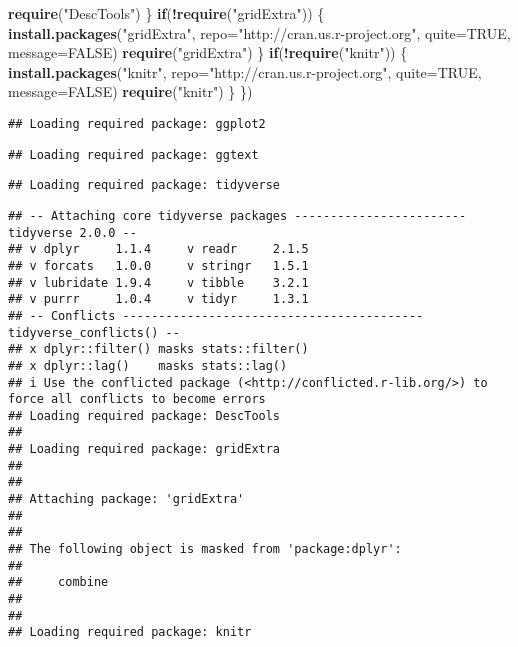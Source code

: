 \documentclass[
]{article}
\newenvironment{Shaded}{\begin{snugshade}}{\end{snugshade}}
\newcommand{\AttributeTok}[1]{\textcolor[rgb]{0.13,0.29,0.53}{#1}}
\newcommand{\ConstantTok}[1]{\textcolor[rgb]{0.56,0.35,0.01}{#1}}
\newcommand{\ControlFlowTok}[1]{\textcolor[rgb]{0.13,0.29,0.53}{\textbf{#1}}}
\newcommand{\FunctionTok}[1]{\textcolor[rgb]{0.13,0.29,0.53}{\textbf{#1}}}
\newcommand{\NormalTok}[1]{#1}
\newcommand{\SpecialCharTok}[1]{\textcolor[rgb]{0.81,0.36,0.00}{\textbf{#1}}}
\newcommand{\StringTok}[1]{\textcolor[rgb]{0.31,0.60,0.02}{#1}}
\begin{document}
\begin{Shaded}
\begin{Highlighting}[]
 \FunctionTok{require}\NormalTok{(}\StringTok{"DescTools"}\NormalTok{)}
\NormalTok{ \}}
 \ControlFlowTok{if}\NormalTok{(}\SpecialCharTok{!}\FunctionTok{require}\NormalTok{(}\StringTok{"gridExtra"}\NormalTok{)) \{}
 \FunctionTok{install.packages}\NormalTok{(}\StringTok{"gridExtra"}\NormalTok{, }\AttributeTok{repo=}\StringTok{"http://cran.us.r{-}project.org"}\NormalTok{, }\AttributeTok{quite=}\ConstantTok{TRUE}\NormalTok{, }\AttributeTok{message=}\ConstantTok{FALSE}\NormalTok{)}
 \FunctionTok{require}\NormalTok{(}\StringTok{"gridExtra"}\NormalTok{)}
\NormalTok{ \}}
 \ControlFlowTok{if}\NormalTok{(}\SpecialCharTok{!}\FunctionTok{require}\NormalTok{(}\StringTok{"knitr"}\NormalTok{)) \{}
 \FunctionTok{install.packages}\NormalTok{(}\StringTok{"knitr"}\NormalTok{, }\AttributeTok{repo=}\StringTok{"http://cran.us.r{-}project.org"}\NormalTok{, }\AttributeTok{quite=}\ConstantTok{TRUE}\NormalTok{, }\AttributeTok{message=}\ConstantTok{FALSE}\NormalTok{)}
 \FunctionTok{require}\NormalTok{(}\StringTok{"knitr"}\NormalTok{)}
\NormalTok{ \}}
\NormalTok{\})}
\end{Highlighting}
\end{Shaded}

\begin{verbatim}
## Loading required package: ggplot2
\end{verbatim}

\begin{verbatim}
## Loading required package: ggtext
\end{verbatim}

\begin{verbatim}
## Loading required package: tidyverse
\end{verbatim}

\begin{verbatim}
## -- Attaching core tidyverse packages ------------------------ tidyverse 2.0.0 --
## v dplyr     1.1.4     v readr     2.1.5
## v forcats   1.0.0     v stringr   1.5.1
## v lubridate 1.9.4     v tibble    3.2.1
## v purrr     1.0.4     v tidyr     1.3.1
## -- Conflicts ------------------------------------------ tidyverse_conflicts() --
## x dplyr::filter() masks stats::filter()
## x dplyr::lag()    masks stats::lag()
## i Use the conflicted package (<http://conflicted.r-lib.org/>) to force all conflicts to become errors
## Loading required package: DescTools
## 
## Loading required package: gridExtra
## 
## 
## Attaching package: 'gridExtra'
## 
## 
## The following object is masked from 'package:dplyr':
## 
##     combine
## 
## 
## Loading required package: knitr
\end{verbatim}
\end{document}
